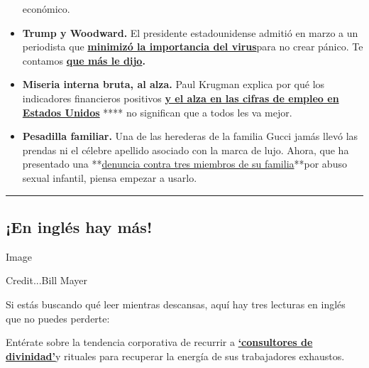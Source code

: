 \begin{itemize}
  económico.
\item
  \textbf{Trump y Woodward.} El presidente estadounidense admitió en
  marzo a un periodista que
  \textbf{\href{https://www.nytimes3xbfgragh.onion/es/2020/09/09/espanol/estados-unidos/trump-woodward.html}{minimizó
  la importancia del
  virus}}\href{https://www.nytimes3xbfgragh.onion/es/2020/09/09/espanol/estados-unidos/trump-woodward.html}{}para
  no crear pánico. Te contamos
  \textbf{\href{https://www.nytimes3xbfgragh.onion/es/2020/09/10/espanol/estados-unidos/bob-woodward-trump-rage.html}{que
  más le dijo}.}
\item
  \textbf{Miseria interna bruta, al alza.} Paul Krugman explica por qué
  los indicadores financieros positivos
  \textbf{\href{https://www.nytimes3xbfgragh.onion/es/2020/09/09/espanol/opinion/trump-empleo-economia.html}{y
  el alza en las cifras de empleo en Estados Unidos}} **** no significan
  que a todos les va mejor.
\item
  \textbf{Pesadilla familiar.} Una de las herederas de la familia Gucci
  jamás llevó las prendas ni el célebre apellido asociado con la marca
  de lujo. Ahora, que ha presentado una
  **\href{https://www.nytimes3xbfgragh.onion/es/2020/09/10/espanol/estilos-de-vida/gucci-abuso-sexual.html}{denuncia
  contra tres miembros de su familia}**por abuso sexual infantil, piensa
  empezar a usarlo.
\end{itemize}

\begin{center}\rule{0.5\linewidth}{\linethickness}\end{center}

\hypertarget{en-ingluxe9s-hay-muxe1s}{%
\subsection{¡En inglés hay más!}\label{en-ingluxe9s-hay-muxe1s}}

Image

Credit...Bill Mayer

Si estás buscando qué leer mientras descansas, aquí hay tres lecturas en
inglés que no puedes perderte:

Entérate sobre la tendencia corporativa de recurrir a
\textbf{\href{https://www.nytimes3xbfgragh.onion/2020/08/28/business/remote-work-spiritual-consultants.html}{`consultores
de
divinidad'}}\href{https://www.nytimes3xbfgragh.onion/2020/08/28/business/remote-work-spiritual-consultants.html}{}y
rituales para recuperar la energía de sus trabajadores exhaustos.

